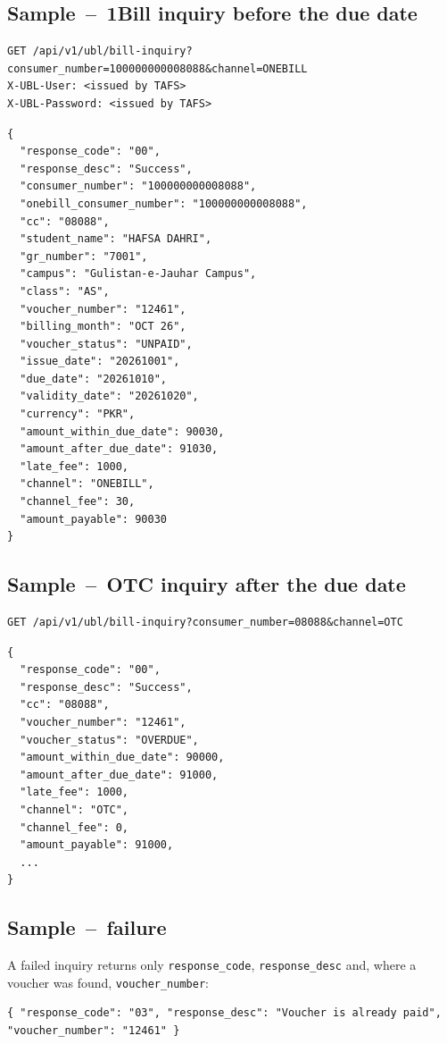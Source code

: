 \documentclass[11pt]{article}
\begin{document}
\subsection{Sample \,--\, 1Bill inquiry before the due date}
\begin{lstlisting}
GET /api/v1/ubl/bill-inquiry?consumer_number=100000000008088&channel=ONEBILL
X-UBL-User: <issued by TAFS>
X-UBL-Password: <issued by TAFS>
\end{lstlisting}
\begin{lstlisting}
{
  "response_code": "00",
  "response_desc": "Success",
  "consumer_number": "100000000008088",
  "onebill_consumer_number": "100000000008088",
  "cc": "08088",
  "student_name": "HAFSA DAHRI",
  "gr_number": "7001",
  "campus": "Gulistan-e-Jauhar Campus",
  "class": "AS",
  "voucher_number": "12461",
  "billing_month": "OCT 26",
  "voucher_status": "UNPAID",
  "issue_date": "20261001",
  "due_date": "20261010",
  "validity_date": "20261020",
  "currency": "PKR",
  "amount_within_due_date": 90030,
  "amount_after_due_date": 91030,
  "late_fee": 1000,
  "channel": "ONEBILL",
  "channel_fee": 30,
  "amount_payable": 90030
}
\end{lstlisting}

\subsection{Sample \,--\, OTC inquiry after the due date}
\begin{lstlisting}
GET /api/v1/ubl/bill-inquiry?consumer_number=08088&channel=OTC
\end{lstlisting}
\begin{lstlisting}
{
  "response_code": "00",
  "response_desc": "Success",
  "cc": "08088",
  "voucher_number": "12461",
  "voucher_status": "OVERDUE",
  "amount_within_due_date": 90000,
  "amount_after_due_date": 91000,
  "late_fee": 1000,
  "channel": "OTC",
  "channel_fee": 0,
  "amount_payable": 91000,
  ...
}
\end{lstlisting}

\subsection{Sample \,--\, failure}
A failed inquiry returns only \texttt{response\_code}, \texttt{response\_desc} and, where a voucher was found,
\texttt{voucher\_number}:
\begin{lstlisting}
{ "response_code": "03", "response_desc": "Voucher is already paid", "voucher_number": "12461" }
\end{lstlisting}
\end{document}
